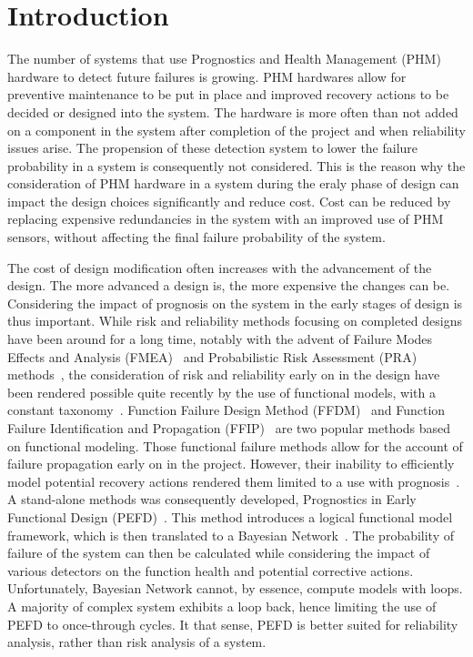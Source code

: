 \section{Introduction}
The number of systems that use Prognostics and Health Management (PHM) hardware to detect future failures is growing. PHM hardwares allow for preventive maintenance to be put in place and improved recovery actions to be decided or designed into the system. The hardware is more often than not added on a component in the system after completion of the project and when reliability issues arise. The propension of these detection system to lower the failure probability in a system is consequently not considered. This is the reason why the consideration of PHM hardware in a system during the eraly phase of design can impact the design choices significantly and reduce cost. Cost can be reduced by replacing expensive redundancies in the system with an improved use of PHM sensors, without affecting the final failure probability of the system.

The cost of design modification often increases with the advancement of the design. The more advanced a design is, the more expensive the changes can be. Considering the impact of prognosis on the system in the early stages of design is thus important. While risk and reliability methods focusing on completed designs have been around for a long time, notably with the advent of Failure Modes Effects and Analysis (FMEA)~\cite{liu2013} and Probabilistic Risk Assessment (PRA) methods~\cite{saphire}, the consideration of risk and reliability early on in the design have been rendered possible quite recently by the use of functional models, with a constant taxonomy~\cite{stone}. Function Failure Design Method (FFDM)~\cite{stone2005} and Function Failure Identification and Propagation (FFIP)~\cite{kurtoglu2007} are two popular methods based on functional modeling. Those functional failure methods allow for the account of failure propagation early on in the project. However, their inability to efficiently model potential recovery actions rendered them limited to a use with prognosis~\cite{stack2015}. A stand-alone methods was consequently developed, Prognostics in Early Functional Design (PEFD)~\cite{lher2016}. This method introduces a logical functional model framework, which is then translated to a Bayesian Network~\cite{bnbook}. The probability of failure of the system can then be calculated while considering the impact of various detectors on the function health and potential corrective actions. Unfortunately, Bayesian Network cannot, by essence, compute models with loops. A majority of complex system exhibits a loop back, hence limiting the use of PEFD to once-through cycles. It that sense, PEFD is better suited for reliability analysis, rather than risk analysis of a system.

